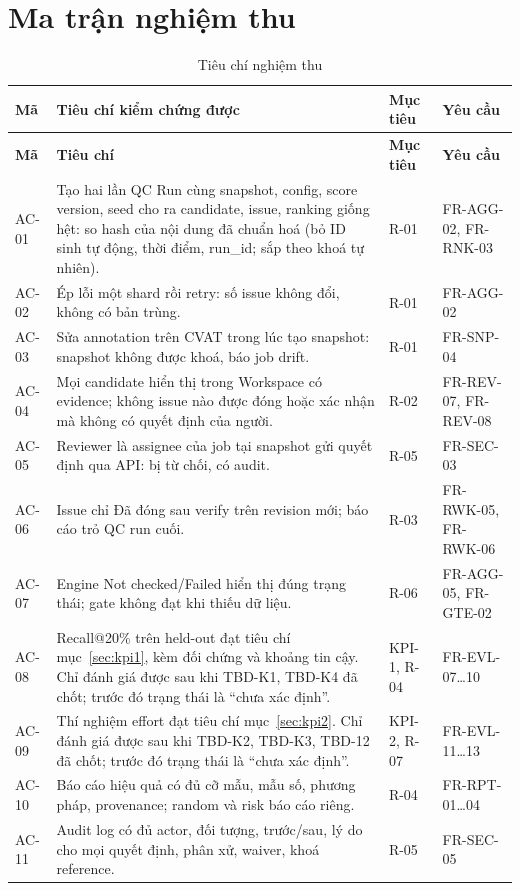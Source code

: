 \section{Ma trận nghiệm thu}
\label{sec:acceptance}
\begin{xltabular}{\linewidth}{@{}L{1.2cm}Y L{1.6cm}L{3cm}@{}}
\caption{Tiêu chí nghiệm thu}\label{tab:acceptance}\\
\toprule
\textbf{Mã} & \textbf{Tiêu chí kiểm chứng được} & \textbf{Mục tiêu} & \textbf{Yêu cầu}\\
\midrule
\endfirsthead
\toprule \textbf{Mã} & \textbf{Tiêu chí} & \textbf{Mục tiêu} & \textbf{Yêu cầu}\\ \midrule
\endhead
\bottomrule
\endfoot
AC-01 & Tạo hai lần QC Run cùng snapshot, config, score version, seed cho ra candidate, issue, ranking giống hệt: so hash của nội dung đã chuẩn hoá (bỏ ID sinh tự động, thời điểm, run\_id; sắp theo khoá tự nhiên). & R-01 & FR-AGG-02, FR-RNK-03\\
AC-02 & Ép lỗi một shard rồi retry: số issue không đổi, không có bản trùng. & R-01 & FR-AGG-02\\
AC-03 & Sửa annotation trên CVAT trong lúc tạo snapshot: snapshot không được khoá, báo job drift. & R-01 & FR-SNP-04\\
AC-04 & Mọi candidate hiển thị trong Workspace có evidence; không issue nào được đóng hoặc xác nhận mà không có quyết định của người. & R-02 & FR-REV-07, FR-REV-08\\
AC-05 & Reviewer là assignee của job tại snapshot gửi quyết định qua API: bị từ chối, có audit. & R-05 & FR-SEC-03\\
AC-06 & Issue chỉ Đã đóng sau verify trên revision mới; báo cáo trỏ QC run cuối. & R-03 & FR-RWK-05, FR-RWK-06\\
AC-07 & Engine Not checked/Failed hiển thị đúng trạng thái; gate không đạt khi thiếu dữ liệu. & R-06 & FR-AGG-05, FR-GTE-02\\
AC-08 & Recall@20\% trên held-out đạt tiêu chí mục~\ref{sec:kpi1}, kèm đối chứng và khoảng tin cậy. Chỉ đánh giá được sau khi TBD-K1, TBD-K4 đã chốt; trước đó trạng thái là ``chưa xác định''. & KPI-1, R-04 & FR-EVL-07…10\\
AC-09 & Thí nghiệm effort đạt tiêu chí mục~\ref{sec:kpi2}. Chỉ đánh giá được sau khi TBD-K2, TBD-K3, TBD-12 đã chốt; trước đó trạng thái là ``chưa xác định''. & KPI-2, R-07 & FR-EVL-11…13\\
AC-10 & Báo cáo hiệu quả có đủ cỡ mẫu, mẫu số, phương pháp, provenance; random và risk báo cáo riêng. & R-04 & FR-RPT-01…04\\
AC-11 & Audit log có đủ actor, đối tượng, trước/sau, lý do cho mọi quyết định, phân xử, waiver, khoá reference. & R-05 & FR-SEC-05\\
\end{xltabular}
